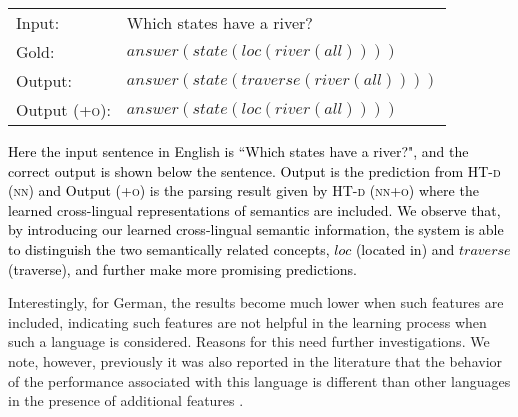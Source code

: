 \documentclass[11pt,a4paper]{article}
\begin{document}
{{{{{\begin{table}[h]
{		\begin{tabular}{ll}
			{Input}:& Which states have a river? \\
			{Gold}:& $answer(state(loc(river(all))))$ \\
			\hline
			{Output}:& $answer(state(traverse(river(all))))$ \\
			{Output \textsc{(+o)}}:& $answer(state(loc(river(all))))$ \\
		\end{tabular}
	}
	\label{tab:problem_definition}
\end{table}

\textcolor{black}{Here  the input sentence in English is ``Which states have a river?", and the correct output is shown below the sentence.
Output is the prediction from \textsc{HT-d (nn)} and Output (\textsc{+o}) is the parsing result given by \textsc{HT-d (nn+o)} where the learned cross-lingual representations of semantics are included.
We observe that, by introducing our learned cross-lingual semantic information, the system is able to distinguish the two semantically related concepts, ${loc}$ (located in) and ${traverse}$ (traverse), and further make more promising predictions.}

Interestingly, for German, the results become much lower when such features are included,
indicating such features are not helpful in the learning process when such a language is considered.
Reasons for this need further investigations. We note, however, previously it was also reported in the literature that the behavior of the performance associated with this language is different than other languages in the presence of additional features \cite{Luw:14}.

}}}}}
\end{document}

